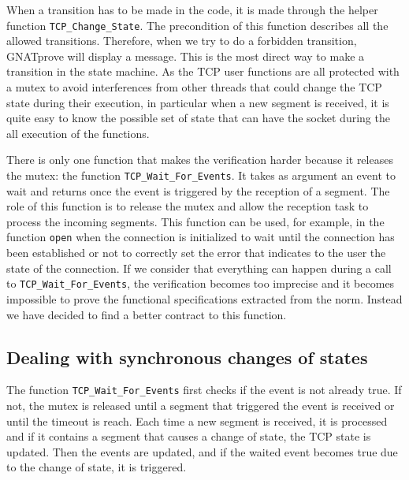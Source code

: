 \documentclass[conference]{IEEEtran}
\def\spark#1{\lstinline[language=Ada]{#1}}
\begin{document}
When a transition has to be made in the code, it is made through the helper
function \spark{TCP_Change_State}. The precondition of this function describes
all the allowed transitions. Therefore, when we try to do a forbidden transition,
GNATprove will display a message. This is the most direct way to make a
transition in the state machine.
As the TCP user functions are all protected with a mutex to avoid interferences
from other threads that could change the TCP state during their execution, in
particular when a new segment is received, it is quite easy to know the
possible set of state that can have the socket during the all execution of the
functions.

There is only one function that makes the verification harder because it
releases the mutex: the function \spark{TCP_Wait_For_Events}.
It takes as argument an event to wait and returns once the event
is triggered by the reception of a segment.
The role of this
function is to release the mutex and allow the reception task to process the
incoming segments. This function
can be used, for example, in the function \spark{open} when the connection
is initialized to wait until the connection has been established or not to
correctly set the error that indicates to the user the state of the connection.
If we consider that everything can happen during a call to \spark{TCP_Wait_For_Events},
the verification becomes too imprecise and it becomes impossible to prove the
functional specifications extracted from the norm. Instead we have decided to
find a better contract to this function.

\subsection{Dealing with synchronous changes of states}

The function \spark{TCP_Wait_For_Events} first checks if the event is not already
true. If not, the mutex is released until a segment that triggered the event is
received or until the timeout is reach. Each time a new segment is received, it
is processed and if it contains a segment that causes a change of state, the TCP
state is updated. Then the events are updated, and if the waited event becomes
true due to the change of state, it is triggered.
\end{document}
